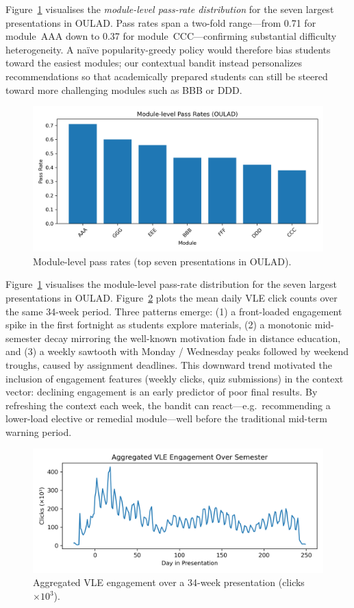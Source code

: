 \documentclass[conference]{IEEEtran}
\begin{document}
Figure~\ref{fig:passrate} visualises the \emph{module-level pass-rate distribution}
for the seven largest presentations in OULAD.
Pass rates span a two-fold range—from 0.71 for module~AAA down to 0.37 for
module~CCC—confirming substantial difficulty heterogeneity.
A naïve popularity-greedy policy would therefore bias students toward the
easiest modules; our contextual bandit instead personalizes
recommendations so that academically prepared students can still be steered
toward more challenging modules such as BBB or DDD.

\begin{figure}[t]
  \centering
  \includegraphics[width=\linewidth]{fig_passrate.png}
  \caption{Module-level pass rates (top seven presentations in OULAD).}
  \label{fig:passrate}
\end{figure}
Figure~\ref{fig:passrate} visualises the module-level pass-rate
distribution for the seven largest presentations in \textsc{OULAD}.
Figure~\ref{fig:engagement} plots the mean daily VLE click counts over the same 34-week period.
Three patterns emerge:
(1) a front-loaded engagement spike in the first fortnight as students
explore materials,
(2) a monotonic mid-semester decay mirroring the well-known motivation fade
in distance education, and
(3) a weekly sawtooth with Monday / Wednesday peaks followed by weekend troughs,
caused by assignment deadlines.
This downward trend motivated the inclusion of engagement features
(weekly clicks, quiz submissions) in the context vector:
declining engagement is an early predictor of poor final results.
By refreshing the context each week, the bandit can react—e.g.\ recommending
a lower-load elective or remedial module—well before the traditional
mid-term warning period.

\begin{figure}[t]
  \centering
  \includegraphics[width=\linewidth]{fig_engagement.png}
  \caption{Aggregated VLE engagement over a 34-week presentation
           (clicks $\times10^{3}$).}
  \label{fig:engagement}
\end{figure}
\end{document}
